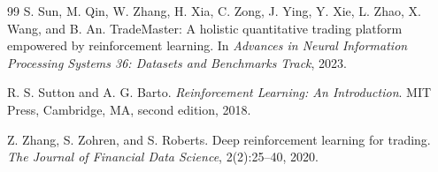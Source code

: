 \documentclass[10pt,twocolumn]{article}
\begin{document}
\begin{thebibliography}{99}
S. Sun, M. Qin, W. Zhang, H. Xia, C. Zong, J. Ying, Y. Xie, L. Zhao,
  X. Wang, and B. An.
\newblock TradeMaster: A holistic quantitative trading platform empowered by
  reinforcement learning.
\newblock In \emph{Advances in Neural Information Processing Systems 36:
  Datasets and Benchmarks Track}, 2023.

R. S. Sutton and A. G. Barto.
\newblock \emph{Reinforcement Learning: An Introduction}.
\newblock MIT Press, Cambridge, MA, second edition, 2018.

Z. Zhang, S. Zohren, and S. Roberts.
\newblock Deep reinforcement learning for trading.
\newblock \emph{The Journal of Financial Data Science}, 2(2):25--40, 2020.

\end{thebibliography}
\end{document}
